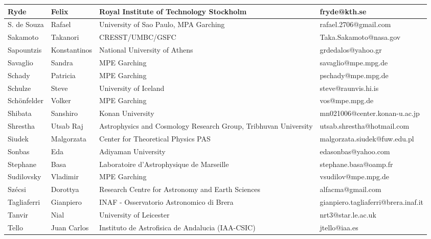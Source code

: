 \begin{center}
\begin{longtable}{|p{1.28cm} |p{1.28cm} |p{2.9cm} |p{3cm} |}
\tiny Ryde &\tiny Felix & \tiny Royal Institute of Technology Stockholm & \tiny fryde@kth.se \\ \hline
\tiny S. de Souza &\tiny Rafael & \tiny University of Sao Paulo, MPA Garching & \tiny rafael.2706@gmail.com \\ \hline
\tiny Sakamoto &\tiny Takanori & \tiny CRESST/UMBC/GSFC & \tiny Taka.Sakamoto@nasa.gov \\ \hline
\tiny Sapountzis &\tiny Konstantinos & \tiny National University of Athens & \tiny grdedalos@yahoo.gr \\ \hline
\tiny Savaglio &\tiny Sandra & \tiny MPE Garching & \tiny savaglio@mpe.mpg.de \\ \hline
\tiny Schady &\tiny Patricia & \tiny MPE Garching & \tiny pschady@mpe.mpg.de \\ \hline
\tiny Schulze &\tiny Steve & \tiny University of Iceland & \tiny steve@raunvis.hi.is \\ \hline
\tiny Sch\"onfelder &\tiny Volker & \tiny MPE Garching & \tiny vos@mpe.mpg.de \\ \hline
\tiny Shibata &\tiny Sanshiro & \tiny Konan University & \tiny mn021006@center.konan-u.ac.jp \\ \hline
\tiny Shrestha &\tiny Utsab Raj & \tiny Astrophysics and Cosmology Research Group, Tribhuvan University & \tiny utsab.shrestha@hotmail.com \\ \hline
\tiny Siudek &\tiny Malgorzata & \tiny Center for Theoretical Physics PAS & \tiny malgorzata.siudek@fuw.edu.pl \\ \hline
\tiny Sonbas &\tiny Eda & \tiny Adiyaman University & \tiny edasonbas@yahoo.com \\ \hline
\tiny Stephane &\tiny Basa & \tiny Laboratoire d'Astrophysique de Marseille & \tiny stephane.basa@oamp.fr \\ \hline
\tiny Sudilovsky &\tiny Vladimir & \tiny MPE Garching & \tiny vsudilov@mpe.mpg.de \\ \hline
\tiny Sz\'ecsi &\tiny Dorottya & \tiny Research Centre for Astronomy and Earth Sciences & \tiny alfacma@gmail.com \\ \hline
\tiny Tagliaferri &\tiny Gianpiero & \tiny INAF - Osservatorio Astronomico di Brera & \tiny gianpiero.tagliaferri@brera.inaf.it \\ \hline
\tiny Tanvir &\tiny Nial & \tiny University of Leicester & \tiny nrt3@star.le.ac.uk \\ \hline
\tiny Tello &\tiny Juan Carlos & \tiny Instituto de Astrofisica de Andalucia (IAA-CSIC) & \tiny jtello@iaa.es \\ \hline

\end{longtable}
\end{center}
